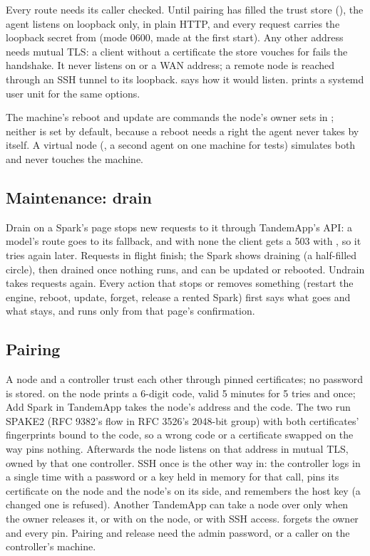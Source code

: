 Every route needs its caller checked. Until pairing has filled the trust store (), the agent listens on loopback only, in plain HTTP, and every request carries the loopback secret from  (mode 0600, made at the first start). Any other address needs mutual TLS: a client without a certificate the store vouches for fails the handshake. It never listens on  or a WAN address; a remote node is reached through an SSH tunnel to its loopback.  says how it would listen.  prints a systemd user unit for the same options.

The machine's reboot and update are commands the node's owner sets in ; neither is set by default, because a reboot needs a right the agent never takes by itself. A virtual node (, a second agent on one machine for tests) simulates both and never touches the machine.

\subsection{Maintenance: drain}

Drain on a Spark's page stops new requests to it through TandemApp's API: a model's route goes to its fallback, and with none the client gets a 503 with , so it tries again later. Requests in flight finish; the Spark shows draining (a half-filled circle), then drained once nothing runs, and can be updated or rebooted. Undrain takes requests again. Every action that stops or removes something (restart the engine, reboot, update, forget, release a rented Spark) first says what goes and what stays, and runs only from that page's confirmation.

\subsection{Pairing}

A node and a controller trust each other through pinned certificates; no password is stored.  on the node prints a 6-digit code, valid 5 minutes for 5 tries and once; Add Spark in TandemApp takes the node's address and the code. The two run SPAKE2 (RFC 9382's flow in RFC 3526's 2048-bit group) with both certificates' fingerprints bound to the code, so a wrong code or a certificate swapped on the way pins nothing. Afterwards the node listens on that address in mutual TLS, owned by that one controller. SSH once is the other way in: the controller logs in a single time with a password or a key held in memory for that call, pins its certificate on the node and the node's on its side, and remembers the host key (a changed one is refused). Another TandemApp can take a node over only when the owner releases it, or with  on the node, or with SSH access.  forgets the owner and every pin. Pairing and release need the admin password, or a caller on the controller's machine.

